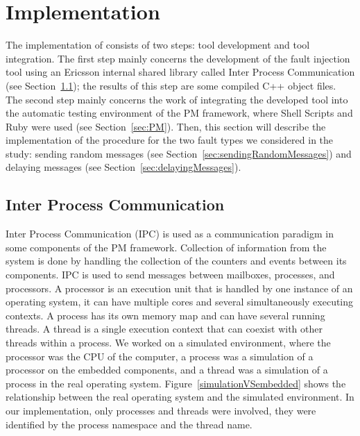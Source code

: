 \section{Implementation}\label{sec:implementation}

The implementation of \approach{} consists of two steps: tool development and tool integration. The first step mainly concerns the development of the fault injection tool using an Ericsson internal shared library called Inter Process Communication (see Section~\ref{sec:IPC}); the results of this step are some compiled C++ object files. The second step mainly concerns the work of integrating the developed tool into the automatic testing environment of the PM framework, where Shell Scripts and Ruby were used (see Section~\ref{sec:PM}). Then, this section will describe the implementation of the procedure for the two fault types we considered in the study: sending random messages (see Section~\ref{sec:sendingRandomMessages}) and delaying messages (see Section~\ref{sec:delayingMessages}).

\subsection{Inter Process Communication}\label{sec:IPC}
Inter Process Communication (IPC) is used as a communication paradigm in some components of the PM framework. Collection of information from the system is done by handling the collection of the counters and events between its components. %
 IPC is used to send messages between mailboxes, processes, and processors. A processor is an execution unit that is handled by one instance of an operating system, it can have multiple cores and several simultaneously executing contexts. A process has its own memory map and can have several running threads. A thread is a single execution context that can coexist with other threads within a process. We worked on a simulated environment, where the processor was the CPU of the computer, a process was a simulation of a processor on the embedded components,  and a thread was a simulation of a process in the real operating system. Figure~\ref{simulationVSembedded} shows the relationship between the real operating system and the simulated environment. In our implementation, only processes and threads were involved, they were identified by the process namespace and the thread name. %

